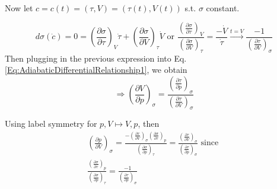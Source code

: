 \quad \\
Now let $c=c(t) = (\tau, V) = (\tau(t), V(t))$ s.t. $\sigma$ constant.

\[
d\sigma(\dot{c}) = 0 = \left( \frac{\partial \sigma}{\partial \tau} \right)_V \dot{\tau} + \left( \frac{\partial \sigma}{\partial V} \right)_{\tau} \dot{V} \text{ or } \frac{ \left( \frac{\partial \sigma}{\partial \tau}\right)_V }{ \left( \frac{\partial \sigma}{\partial V}\right)_{\tau} } = \frac{  - \dot{V}}{\dot{\tau}} \xrightarrow{ t = V} \frac{-1}{ \left( \frac{\partial \tau}{\partial V} \right)_{\sigma} }
\]
Then plugging in the previous expression into Eq. \ref{Eq:AdiabaticDifferentialRelationship1}, we obtain
\begin{equation}\label{Eq:AdiabaticCompressionOfV}
\Longrightarrow \left( \frac{\partial V}{ \partial p} \right)_{\sigma} = \frac{ \left( \frac{\partial \tau }{\partial p} \right)_{\sigma} }{ \left( \frac{\partial \tau}{\partial V} \right)_{\sigma} }
\end{equation}

Using label symmetry for $p, V \mapsto V, p$, then
\[
\begin{gathered}
\left( \frac{\partial p}{\partial V} \right)_{\sigma} =  \frac{ - \left( \frac{\partial \tau}{\partial V} \right)_{\sigma} \left( \frac{\partial \sigma}{\partial \tau}\right)_p }{ \left( \frac{\partial \sigma}{\partial p}\right)_{\tau} } = \frac{ \left( \frac{\partial \tau }{\partial V} \right)_{\sigma} }{ \left( \frac{\partial \tau}{\partial p} \right)_{\sigma} } \text{ since } \\
\frac{ \left( \frac{\partial \sigma}{\partial \tau}\right)_p }{ \left( \frac{\partial \sigma}{\partial p}\right)_{\tau} } = \frac{-1}{ \left( \frac{\partial \tau}{\partial p} \right)_{\sigma} }
\end{gathered}
\]

